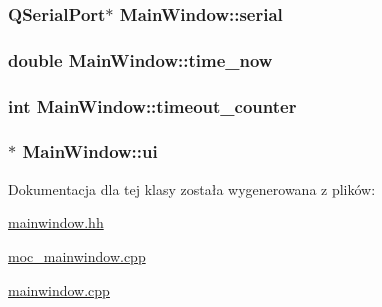 \subsubsection[{\texorpdfstring{serial}{serial}}]{\setlength{\rightskip}{0pt plus 5cm}Q\+Serial\+Port$\ast$ Main\+Window\+::serial\hspace{0.3cm}{\ttfamily [private]}}\hypertarget{class_main_window_a9029411f21223671e111ff617fcece6a}{}\label{class_main_window_a9029411f21223671e111ff617fcece6a}
\subsubsection[{\texorpdfstring{time\+\_\+now}{time_now}}]{\setlength{\rightskip}{0pt plus 5cm}double Main\+Window\+::time\+\_\+now\hspace{0.3cm}{\ttfamily [private]}}\hypertarget{class_main_window_a9b456625e28c62ec7cab475f7a552a2c}{}\label{class_main_window_a9b456625e28c62ec7cab475f7a552a2c}
\subsubsection[{\texorpdfstring{timeout\+\_\+counter}{timeout_counter}}]{\setlength{\rightskip}{0pt plus 5cm}int Main\+Window\+::timeout\+\_\+counter\hspace{0.3cm}{\ttfamily [private]}}\hypertarget{class_main_window_a93b6fc6e9f57184aaa853cf6106396be}{}\label{class_main_window_a93b6fc6e9f57184aaa853cf6106396be}
\subsubsection[{\texorpdfstring{ui}{ui}}]{$\ast$ Main\+Window\+::ui\hspace{0.3cm}{\ttfamily [private]}}\hypertarget{class_main_window_a35466a70ed47252a0191168126a352a5}{}\label{class_main_window_a35466a70ed47252a0191168126a352a5}


Dokumentacja dla tej klasy została wygenerowana z plików\+:\begin{DoxyCompactItemize}
\item 
\hyperlink{mainwindow_8hh}{mainwindow.\+hh}\item 
\hyperlink{moc__mainwindow_8cpp}{moc\+\_\+mainwindow.\+cpp}\item 
\hyperlink{mainwindow_8cpp}{mainwindow.\+cpp}\end{DoxyCompactItemize}
